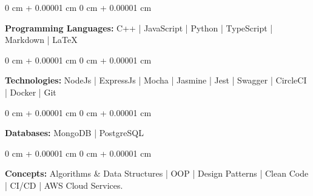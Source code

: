 \documentclass[10pt, letterpaper]{article}
\newenvironment{highlights}{
    \begin{itemize}[
        topsep=0.10 cm,
        parsep=0.10 cm,
        partopsep=0pt,
        itemsep=0pt,
        leftmargin=0 cm + 10pt
    ]
}{
    \end{itemize}
} %
\newenvironment{onecolentry}{
    \begin{adjustwidth}{
        0 cm + 0.00001 cm
    }{
        0 cm + 0.00001 cm
    }
}{
    \end{adjustwidth}
} %
\newenvironment{twocolentry}[2][]{
    \onecolentry
    \def\secondColumn{#2}
    \setcolumnwidth{\fill, 4.5 cm}
    \begin{paracol}{2}
}{
    \switchcolumn \raggedleft \secondColumn
    \end{paracol}
    \endonecolentry
} %
\begin{document}
        \begin{onecolentry}
            \textbf{Programming Languages:} C++ | JavaScript | Python | TypeScript | Markdown | LaTeX
        \end{onecolentry}

        \begin{onecolentry}
            \textbf{Technologies:} NodeJs | ExpressJs | Mocha | Jasmine | Jest | Swagger | CircleCI | Docker | Git
        \end{onecolentry}

        \begin{onecolentry}
            \textbf{Databases:} MongoDB | PostgreSQL
        \end{onecolentry}
        
        \begin{onecolentry}
            \textbf{Concepts:} Algorithms \& Data Structures | OOP | Design Patterns | Clean Code | CI/CD | AWS Cloud Services.
        \end{onecolentry}
        

    
\end{document}
